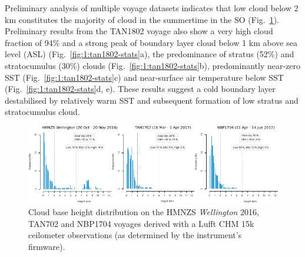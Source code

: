 Preliminary analysis of multiple voyage datasets indicates that low cloud
below 2 km constitutes the majority of cloud in the summertime in the SO
(Fig.\ \ref{fig:1:cbh}). Preliminary results from the TAN1802 voyage also
show a very high cloud fraction of 94\% and a strong peak of boundary layer
cloud below 1 km above sea level (ASL) (Fig.\ \ref{fig:1:tan1802-stats}a), the predominance
of stratus (52\%) and stratocumulus (30\%) clouds (Fig.\ \ref{fig:1:tan1802-stats}b), predominantly
near-zero SST (Fig.\ \ref{fig:1:tan1802-stats}c) and near-surface air temperature below SST
(Fig.\ \ref{fig:1:tan1802-stats}d, e). These results suggest a cold boundary layer
destabilised by relatively warm SST and subsequent formation of
low stratus and stratocumulus cloud.

\begin{figure}[p]
\centerline{\includegraphics[width=1.12\textwidth]{fig/cbh.pdf}}
\caption[Cloud base height distribution]{
Cloud base height distribution on the HMNZS \textit{Wellington} 2016, TAN702 and NBP1704
voyages derived with a Lufft CHM 15k ceilometer observations (as determined by
the instrument's firmware).
}
\label{fig:1:cbh}
\end{figure}

